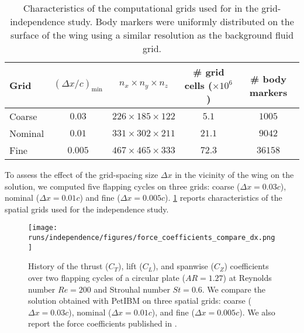 \begin{table}
  \centering
  \begin{tabular}{lcccc}
    \hline\hline
    Grid & $(\Delta x / c)_\text{min}$ & $n_x \times n_y \times n_z$ & \# grid cells ($\times 10^6$) & \# body markers \\
    \hline
    Coarse & $0.03$ & $226 \times 185 \times 122$ & $5.1$ & $1005$ \\
    Nominal & $0.01$ & $331 \times 302 \times 211$ & $21.1$ & $9042$ \\
    Fine & $0.005$ & $467 \times 465 \times 333$ & $72.3$ & $36158$ \\
    \hline\hline
  \end{tabular}
  \caption{Characteristics of the computational grids used for in the grid-independence study. Body markers were uniformly distributed on the surface of the wing using a similar resolution as the background fluid grid.}
  \label{tab:independence_grid_charateristics}
\end{table}

To assess the effect of the grid-spacing size $\Delta x$ in the vicinity of the wing on the solution, we computed five flapping cycles on three grids: coarse ($\Delta x = 0.03c$), nominal ($\Delta x = 0.01c$) and fine ($\Delta x = 0.005c$).
\cref{tab:independence_grid_charateristics} reports characteristics of the spatial grids used for the independence study.

\begin{figure}
  \centering
  \texttt{[image: runs/independence/figures/force\_coefficients\_compare\_dx.png]}
  \caption{History of the thrust ($C_T$), lift ($C_L$), and spanwise ($C_Z$) coefficients over two flapping cycles of a circular plate ($AR = 1.27$) at Reynolds number $Re = 200$ and Strouhal number $St = 0.6$. We compare the solution obtained with PetIBM on three spatial grids: coarse ($\Delta x = 0.03c$), nominal ($\Delta x = 0.01c$), and fine ($\Delta x = 0.005c$). We also report the force coefficients published in \citet{li_dong_2016}.}
  \label{fig:independence_force_coefficients_dx}
\end{figure}

